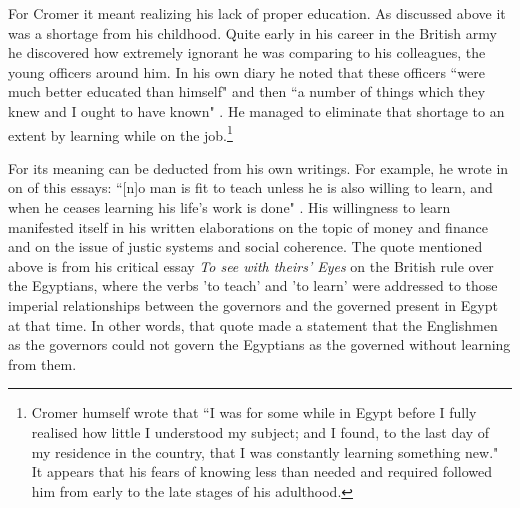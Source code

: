 For Cromer it meant realizing his lack of proper education. As discussed above it was a shortage from his childhood. Quite early in his career in the British army he discovered how extremely ignorant he was comparing to his colleagues, the young officers around him. In his own diary he noted that these officers ``were much better educated than himself" and then ``a number of things which they knew and I ought to have known" \citep[p.~25]{roger2004}. He managed to eliminate that shortage to an extent by learning while on the job.\footnote{Cromer humself wrote that ``I was for some while in Egypt before I fully realised how little I understood my subject; and I found, to the last day of my residence in the country, that I was constantly learning something new." \citep[p.~7]{cromer1908} It appears that his fears of knowing less than needed and required followed him from early to the late stages of his adulthood.}

For \citeauthor{innes1907} its meaning can be deducted from his own writings. For example, he wrote in on of this essays: ``[n]o man is fit to teach unless he is also willing to learn, and when he ceases learning his life's work is done" \citep[p.~45]{innes1907}. His willingness to learn manifested itself in his written elaborations on the topic of money and finance and on the issue of justic systems and social coherence. The quote mentioned above is from his critical essay \textit{To see with theirs' Eyes} on the British rule over the Egyptians, where the verbs 'to teach' and 'to learn' were addressed to those imperial relationships between the governors and the governed present in Egypt at that time. In other words, that quote made a statement that the Englishmen as the governors could not govern the Egyptians as the governed without learning from them.

